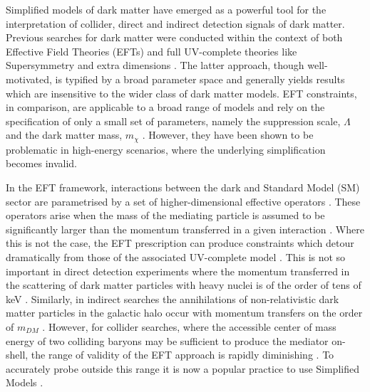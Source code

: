 \begin{flushleft}
Simplified models of dark matter have emerged as a powerful tool for the interpretation of collider, direct and indirect detection signals of dark matter. Previous searches for dark matter were conducted within the context of both Effective Field Theories (EFTs) \cite{Aad:1363019, ATLAS-CONF-2012-147, CMS-PAS-EXO-12-048, Buckley:2013jwa, Abdallah:1472683, MonoZ, MonoX} and full UV-complete theories like Supersymmetry \cite{ComppMSSM, Aad:2012ms, Aad:2012fqa, Aad:2014wea, SUSY_official_paper} and extra dimensions \cite{}. The latter approach, though well-motivated, is typified by a broad parameter space and generally yields results which are insensitive to the wider class of dark matter models. EFT constraints, in comparison, are applicable to a broad range of models and rely on the specification of only a small set of parameters, namely the suppression scale, $\Lambda$ and the dark matter mass, $m_\chi$ \cite{}. However, they have been shown to be problematic in high-energy scenarios, where the underlying simplification becomes invalid.

\hspace{1cm}In the EFT framework, interactions between the dark and Standard Model (SM) sector are parametrised by a set of higher-dimensional effective operators \cite{}. These operators arise when the mass of the mediating particle is assumed to be significantly larger than the momentum transferred in a given interaction \cite{}. Where this is not the case, the EFT prescription can produce constraints which detour dramatically from those of the associated UV-complete model \cite{Bai:2010hh, DMCons2, Fox:2011fx, Graesser:2011vj, An:2011ck}.  This is not so important in direct detection experiments where the momentum transferred in the scattering of dark matter particles with heavy nuclei is of the order of tens of keV \cite{EFTDM, DMCons3}. Similarly, in indirect searches the annihilations of non-relativistic dark matter particles in the galactic halo occur with momentum transfers on the order of $m_{DM}$ \cite{}. However, for collider searches, where the accessible center of mass energy of two colliding baryons may be sufficient to produce the mediator on-shell, the range of validity of the EFT approach is rapidly diminishing \cite{}. 
To accurately probe outside this range it is now a popular practice to use Simplified Models \cite{Buchmueller:2014yoa}.


\end{flushleft}
